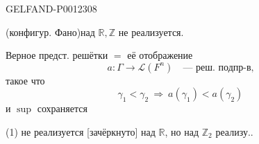 \begin{GelfandAdjacentEvidence}{GELFAND-P001230}{8}

(конфигур. Фано)\qquad над \(\mathbb R,\mathbb Z\) не реализуется.

Верное предст. решётки \(=\) её отображение
\begin{equation*}
a:\Gamma\longrightarrow\mathcal L(F^n)\quad\text{--- реш. подпр-в,}
\end{equation*}
такое что
\begin{equation*}
\gamma_1<\gamma_2\ \Rightarrow\ a(\gamma_1)<a(\gamma_2)
\end{equation*}
и \(\sup\) сохраняется

(1) не реализуется [зачёркнуто] над \(\mathbb R\), но над \(\mathbb Z_2\) реализу..
\end{GelfandAdjacentEvidence}



